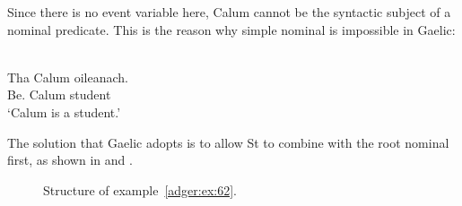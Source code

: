 \documentclass[output=paper]{langsci/langscibook}
\begin{document}
\ea
{}
\z

Since there is no event variable here, Calum cannot be the syntactic subject of a nominal predicate. This is the reason why simple nominal  is impossible in Gaelic:

\ea {}\label{adger:61}\\
    \gll * Tha  Calum  oileanach.\\
         {} Be.\Prs{}  Calum student \\
    \glt {} \enquote*{Calum is a student.}
\z

The solution that Gaelic adopts is to allow St to combine with the root nominal
first, as shown in  and .

\begin{figure}
\caption{Structure of example~\eqref{adger:ex:62}.\label{fig:adger:GaelicSt}}
\end{figure}
\end{document}
